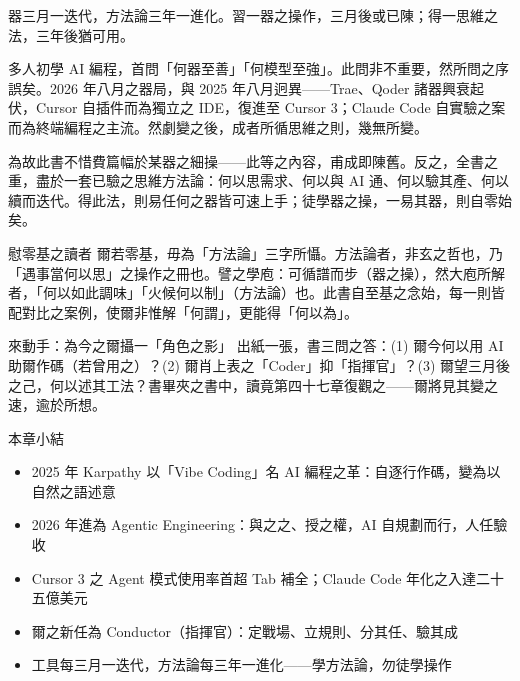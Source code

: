 
器三月一迭代，方法論三年一進化。習一器之操作，三月後或已陳；得一思維之法，三年後猶可用。

多人初學 AI 編程，首問「何器至善」「何模型至強」。此問非不重要，然所問之序誤矣。2026 年八月之器局，與 2025 年八月迥異——Trae、Qoder 諸器興衰起伏，Cursor 自插件而為獨立之 IDE，復進至 Cursor 3；Claude Code 自實驗之案而為終端編程之主流。然劇變之後，成者所循思維之則，幾無所變。

為故此書不惜費篇幅於某器之細操——此等之內容，甫成即陳舊。反之，全書之重，盡於一套已驗之思維方法論：何以思需求、何以與 AI 通、何以驗其產、何以續而迭代。得此法，則易任何之器皆可速上手；徒學器之操，一易其器，則自零始矣。

\begin{tcbinfo}{慰零基之讀者}
爾若零基，毋為「方法論」三字所懾。方法論者，非玄之哲也，乃「遇事當何以思」之操作之冊也。譬之學庖：可循譜而步（器之操），然大庖所解者，「何以如此調味」「火候何以制」（方法論）也。此書自至基之念始，每一則皆配對比之案例，使爾非惟解「何謂」，更能得「何以為」。

\end{tcbinfo}

\begin{tcbpractice}{來動手：為今之爾攝一「角色之影」}
出紙一張，書三問之答：(1) 爾今何以用 AI 助爾作碼（若曾用之）？(2) 爾肖上表之「Coder」抑「指揮官」？(3) 爾望三月後之己，何以述其工法？書畢夾之書中，讀竟第四十七章復觀之——爾將見其變之速，逾於所想。

\end{tcbpractice}

\begin{tcbsummary}{本章小結}
\begin{itemize}
  \item 2025 年 Karpathy 以「Vibe Coding」名 AI 編程之革：自逐行作碼，變為以自然之語述意
  \item 2026 年進為 Agentic Engineering：與之之、授之權，AI 自規劃而行，人任驗收
  \item Cursor 3 之 Agent 模式使用率首超 Tab 補全；Claude Code 年化之入達二十五億美元
  \item 爾之新任為 Conductor（指揮官）：定戰場、立規則、分其任、驗其成
  \item 工具每三月一迭代，方法論每三年一進化——學方法論，勿徒學操作
\end{itemize}

\end{tcbsummary}
